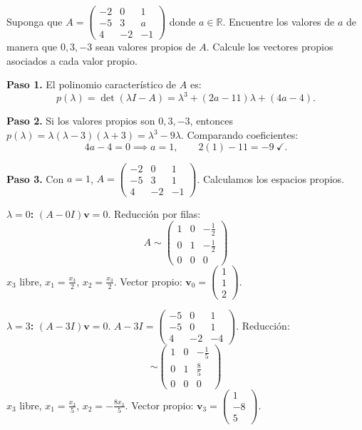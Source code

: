 \begin{prob}
Suponga que $A=\left( \begin{array}{ccc} -2&0&1 \\ -5&3&a\\ 4&-2&-1 \end{array} \right)$ donde $a\in \mathbb{R}.$ Encuentre los valores de $a$ de manera que $0, 3, -3$ sean valores propios de $A.$ Calcule los vectores propios asociados a cada valor propio.
\begin{myproof}
\textbf{Paso 1.} El polinomio característico de $A$ es:
\[
p(\lambda) = \det(\lambda I - A) = \lambda^3 + (2a-11)\lambda + (4a-4).
\]

\textbf{Paso 2.} Si los valores propios son $0,3,-3$, entonces $p(\lambda) = \lambda(\lambda-3)(\lambda+3) = \lambda^3 - 9\lambda$. Comparando coeficientes:
\[
4a - 4 = 0 \implies \boxed{a = 1}, \qquad 2(1)-11 = -9\ \checkmark.
\]

\textbf{Paso 3.} Con $a=1$, $A = \begin{pmatrix}-2&0&1\\-5&3&1\\4&-2&-1\end{pmatrix}$. Calculamos los espacios propios.

\textbf{$\lambda=0$:} $(A-0I)\mathbf{v}=0$. Reducción por filas:
\[
A \sim \begin{pmatrix}1&0&-\tfrac{1}{2}\\0&1&-\tfrac{1}{2}\\0&0&0\end{pmatrix}
\]
$x_3$ libre, $x_1=\tfrac{x_3}{2}$, $x_2=\tfrac{x_3}{2}$. Vector propio: $\mathbf{v}_0=\begin{pmatrix}1\\1\\2\end{pmatrix}$.

\textbf{$\lambda=3$:} $(A-3I)\mathbf{v}=0$. $A-3I=\begin{pmatrix}-5&0&1\\-5&0&1\\4&-2&-4\end{pmatrix}$. Reducción:
\[
\sim \begin{pmatrix}1&0&-\tfrac{1}{5}\\0&1&\tfrac{8}{5}\\0&0&0\end{pmatrix}
\]
$x_3$ libre, $x_1=\tfrac{x_3}{5}$, $x_2=-\tfrac{8x_3}{5}$. Vector propio: $\mathbf{v}_3=\begin{pmatrix}1\\-8\\5\end{pmatrix}$.


\end{myproof}
\end{prob}
